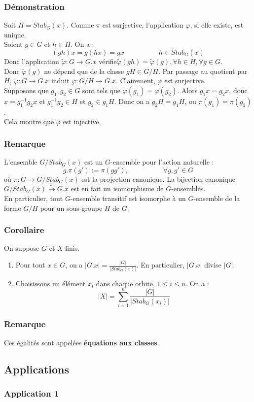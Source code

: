\documentclass[a4paper, oneside]{report}
\newcommand{\dem}{\subsubsection{Démonstration}}
\newcommand{\remar}{\subsubsection{Remarque}}
\newcommand{\cor}{\subsubsection{Corollaire}}
\newcommand{\fong}{\overset{\sim}{\rightarrow}}
\begin{document}
\dem
Soit $H=Stab_G(x)$. Comme $\pi$ est surjective, l'application $\varphi$, si elle existe, est unique.\\
Soient $g\in G$ et $h\in H$. On a :
$$(gh)x = g(hx)=gx\hspace{5em}h\in Stab_G(x)$$
Donc l'application $\tilde{\varphi}: G\rightarrow G.x$ vérifie$\tilde{\varphi}(gh)=\tilde{\varphi}(g), \forall h\in H, \forall g\in G$.\\
Donc $\tilde{\varphi}(g)$ ne dépend que de la classe $gH\in G/H$. Par passage au quotient par $H$, $\tilde{\varphi}:G \rightarrow G.x$ induit $\varphi :G/H \rightarrow G.x$. Clairement, $\varphi$ est surjective.\\
Supposons que $g_1, g_2\in G$ sont tels que $\varphi(g_1)=\varphi(g_2)$. Alors $g_1x=g_2x$, donc $x=g_1^{-1}g_2x$ et $g_1^{-1}g_2\in H$ et $g_2\in g_1H$. Donc on a $g_2H=g_1H$, ou $\pi(g_1)=\pi(g_2)$.\\
Cela montre que $\varphi$ est injective.

\remar
L'ensemble $G/Stab_G(x)$ est un $G$-ensemble pour l'action naturelle :
$$ g.\pi(g') := \pi(gg'),\hspace{5em}\forall g,g'\in G$$
où $\pi : G\rightarrow G/Stab_G(x)$ est la projection canonique. La bijection canonique $G/Stab_G(x)\fong G.x$ est en fait un isomorphisme de $G$-ensembles.\\
En particulier, tout $G$-ensemble transitif est isomorphe à un $G$-ensemble de la forme $G/H$ pour un sous-groupe $H$ de $G$.

\cor
On suppose $G$ et $X$ finis.
\begin{enumerate}
\item Pour tout $x\in G$, on a $|G.x|=\frac{|G|}{|Stab_G(x)|}$. En particulier, $|G.x|$ divise $|G|$.
\item Choisissons un élément $x_i$ dans chaque orbite, $1\leq i \leq n$. On a :
$$|X|=\sum_{i=1}^{n}\frac{|G|}{|Stab_G(x_i)|}$$
\end{enumerate}

\remar
Ces égalités sont appelées \textbf{équations aux classes}.

\subsection{Applications}

\subsubsection{Application 1}
\end{document}
